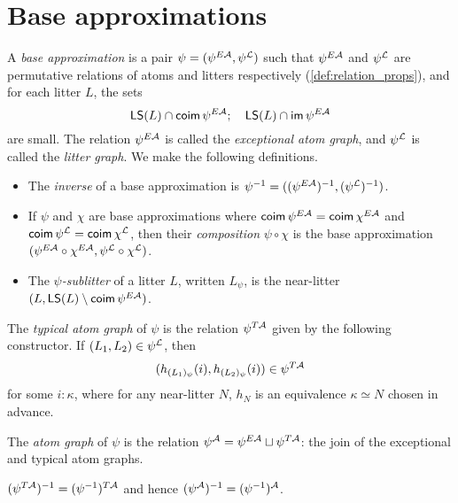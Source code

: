 \section{Base approximations}
\begin{definition}
  \label{def:BaseApprox}
  A \emph{base approximation} is a pair \( \psi = (\psi^{E{\mathcal A}}, \psi^{\mathcal L}) \) such that \( \psi^{E{\mathcal A}} \) and \( \psi^{\mathcal L} \) are permutative relations of atoms and litters respectively (\cref{def:relation_props}), and for each litter \( L \), the sets
  \[ \operatorname{\mathsf{LS}}(L) \cap \operatorname{\mathsf{coim}} \psi^{E{\mathcal A}};\quad \operatorname{\mathsf{LS}}(L) \cap \operatorname{\mathsf{im}} \psi^{E{\mathcal A}} \]
  are small.
  The relation \( \psi^{E{\mathcal A}} \) is called the \emph{exceptional atom graph}, and \( \psi^{\mathcal L} \) is called the \emph{litter graph}.
  We make the following definitions.
  \begin{itemize}
    \item The \emph{inverse} of a base approximation is \( \psi^{-1} = ((\psi^{E{\mathcal A}})^{-1}, (\psi^{\mathcal L})^{-1}) \).
    \item If \( \psi \) and \( \chi \) are base approximations where \( \operatorname{\mathsf{coim}} \psi^{E{\mathcal A}} = \operatorname{\mathsf{coim}} \chi^{E{\mathcal A}} \) and \( \operatorname{\mathsf{coim}} \psi^{\mathcal L} = \operatorname{\mathsf{coim}} \chi^{\mathcal L} \), then their \emph{composition} \( \psi \circ \chi \) is the base approximation \( (\psi^{E{\mathcal A}} \circ \chi^{E{\mathcal A}}, \psi^{\mathcal L} \circ \chi^{\mathcal L}) \).
    \item The \emph{\( \psi \)-sublitter} of a litter \( L \), written \( L_\psi \), is the near-litter \( (L, \operatorname{\mathsf{LS}}(L) \setminus \operatorname{\mathsf{coim}} \psi^{E{\mathcal A}}) \).
  \end{itemize}
\end{definition}
\begin{definition}
  \label{def:atomGraph}
  The \emph{typical atom graph} of \( \psi \) is the relation \( \psi^{T{\mathcal A}} \) given by the following constructor.
  If \( (L_1, L_2) \in \psi^{\mathcal L} \), then
  \[ (h_{(L_1)_\psi}(i), h_{(L_2)_\psi}(i)) \in \psi^{T{\mathcal A}} \]
  for some \( i : \kappa \), where for any near-litter \( N \), \( h_N \) is an equivalence \( \kappa \simeq N \) chosen in advance.

  The \emph{atom graph} of \( \psi \) is the relation \( \psi^{\mathcal A} = \psi^{E{\mathcal A}} \sqcup \psi^{T{\mathcal A}} \): the join of the exceptional and typical atom graphs.
\end{definition}
\begin{proposition}
  \label{prop:atomGraph_inv}
  \( (\psi^{T{\mathcal A}})^{-1} = (\psi^{-1})^{T{\mathcal A}} \) and hence \( (\psi^{\mathcal A})^{-1} = (\psi^{-1})^{\mathcal A} \).
\end{proposition}
